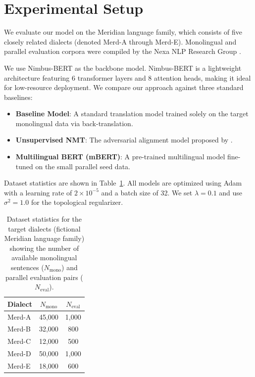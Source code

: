 \section{Experimental Setup}
We evaluate our model on the Meridian language family, which consists of five closely related dialects (denoted Merd-A through Merd-E). Monolingual and parallel evaluation corpora were compiled by the Nexa NLP Research Group \citep{nexa2024large}.

We use Nimbus-BERT \citep{pendelton2024nimbus} as the backbone model. Nimbus-BERT is a lightweight architecture featuring 6 transformer layers and 8 attention heads, making it ideal for low-resource deployment. We compare our approach against three standard baselines:
\begin{itemize}
    \item \textbf{Baseline Model}: A standard translation model trained solely on the target monolingual data via back-translation.
    \item \textbf{Unsupervised NMT}: The adversarial alignment model proposed by \citet{zhang2025crosslingual}.
    \item \textbf{Multilingual BERT (mBERT)}: A pre-trained multilingual model fine-tuned on the small parallel seed data.
\end{itemize}

Dataset statistics are shown in Table~\ref{tab:datasets}. All models are optimized using Adam with a learning rate of $2 \times 10^{-5}$ and a batch size of 32. We set $\lambda = 0.1$ and use $\sigma^2 = 1.0$ for the topological regularizer.

\begin{table}[h]
  \centering
  \small
  \caption{Dataset statistics for the target dialects (fictional Meridian language family) showing the number of available monolingual sentences ($N_{\text{mono}}$) and parallel evaluation pairs ($N_{\text{eval}}$).}
  \label{tab:datasets}
  \vspace{0.5em}
  \begin{tabular}{lcc}
    \toprule
    \textbf{Dialect} & \textbf{$N_{\text{mono}}$} & \textbf{$N_{\text{eval}}$} \\
    \midrule
    Merd-A & 45,000 & 1,000 \\
    Merd-B & 32,000 & 800 \\
    Merd-C & 12,000 & 500 \\
    Merd-D & 50,000 & 1,000 \\
    Merd-E & 18,000 & 600 \\
    \bottomrule
  \end{tabular}
\end{table}

